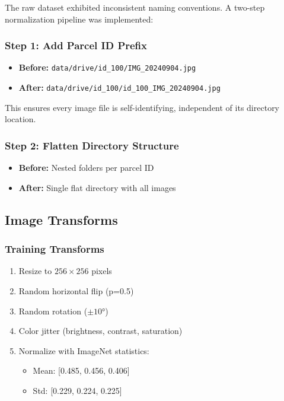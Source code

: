 \documentclass[12pt,a4paper]{article}
\begin{document}
The raw dataset exhibited inconsistent naming conventions. A two-step normalization pipeline was implemented:

\subsubsection{Step 1: Add Parcel ID Prefix}

\begin{itemize}
    \item \textbf{Before:} \texttt{data/drive/id\_100/IMG\_20240904.jpg}
    \item \textbf{After:} \texttt{data/drive/id\_100/id\_100\_IMG\_20240904.jpg}
\end{itemize}

This ensures every image file is self-identifying, independent of its directory location.

\subsubsection{Step 2: Flatten Directory Structure}

\begin{itemize}
    \item \textbf{Before:} Nested folders per parcel ID
    \item \textbf{After:} Single flat directory with all images
\end{itemize}

\subsection{Image Transforms}

\subsubsection{Training Transforms}

\begin{enumerate}
    \item Resize to $256 \times 256$ pixels
    \item Random horizontal flip (p=0.5)
    \item Random rotation ($\pm 10°$)
    \item Color jitter (brightness, contrast, saturation)
    \item Normalize with ImageNet statistics:
    \begin{itemize}
        \item Mean: [0.485, 0.456, 0.406]
        \item Std: [0.229, 0.224, 0.225]
    \end{itemize}
\end{enumerate}
\end{document}
